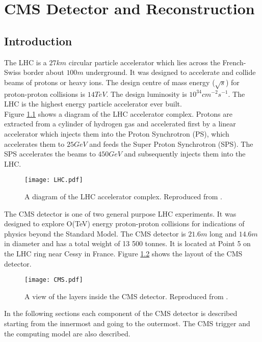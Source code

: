 \chapter{CMS Detector and Reconstruction}

\section{Introduction}

The LHC is a $27\unit{km}$ circular particle accelerator which lies across the
French-Swiss border about $100\unit{m}$ underground. It was designed to accelerate and 
collide beams of protons or heavy ions. The design centre of mass energy
($\sqrt{s}$) for proton-proton collisions is $14\unit{TeV}$. The design 
luminosity is $10^{34}\unit{cm^{-2}s^{-1}}$. The LHC is the highest energy 
particle accelerator ever built. \\

Figure \ref{fig:LHC} shows a diagram of the LHC accelerator complex. Protons are
extracted from a cylinder of hydrogen gas and accelerated first by a linear
accelerator which injects them into the Proton Synchrotron (PS), which 
accelerates them to $25\unit{GeV}$ and feeds the Super Proton Synchrotron 
(SPS). The SPS accelerates the beams to $450\unit{GeV}$ and subsequently injects 
them into the LHC. \\

\begin{figure}
\texttt{[image: LHC.pdf]}
\caption{A diagram of the LHC accelerator complex. Reproduced from
\cite{physics_tdr_1}.}
\label{fig:LHC}
\end{figure}

The CMS detector is one of two general purpose LHC experiments. It was designed 
to explore O(TeV) energy proton-proton collisions for indications of physics 
beyond the Standard Model. The CMS detector is $21.6\unit{m}$ long and 
$14.6\unit{m}$ in diameter and has a total weight of 13 500 tonnes. It is 
located at Point 5 on the LHC ring near Cessy in France. Figure \ref{fig:CMS} 
shows the layout of the CMS detector. \\

\begin{figure}
\texttt{[image: CMS.pdf]}
\caption{A view of the layers inside the CMS detector. Reproduced from
\cite{physics_tdr_1}.}
\label{fig:CMS}
\end{figure}

In the following sections each component of the CMS detector is described 
starting from the innermost and going to the outermost. The CMS trigger and the
computing model are also described. 

